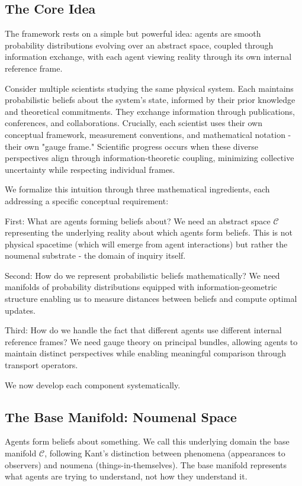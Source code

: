 \documentclass[11pt]{article}
\begin{document}
\subsection{The Core Idea}

The framework rests on a simple but powerful idea: agents are smooth probability distributions evolving over an abstract space, coupled through information exchange, with each agent viewing reality through its own internal reference frame.

Consider multiple scientists studying the same physical system. Each maintains probabilistic beliefs about the system's state, informed by their prior knowledge and theoretical commitments. They exchange information through publications, conferences, and collaborations. Crucially, each scientist uses their own conceptual framework, measurement conventions, and mathematical notation - their own "gauge frame." Scientific progress occurs when these diverse perspectives align through information-theoretic coupling, minimizing collective uncertainty while respecting individual frames.

We formalize this intuition through three mathematical ingredients, each addressing a specific conceptual requirement:

First: What are agents forming beliefs about? We need an abstract space $\mathcal{C}$ representing the underlying reality about which agents form beliefs. This is not physical spacetime (which will emerge from agent interactions) but rather the noumenal substrate - the domain of inquiry itself.

Second: How do we represent probabilistic beliefs mathematically? We need manifolds of probability distributions equipped with information-geometric structure enabling us to measure distances between beliefs and compute optimal updates.

Third: How do we handle the fact that different agents use different internal reference frames? We need gauge theory on principal bundles, allowing agents to maintain distinct perspectives while enabling meaningful comparison through transport operators.

We now develop each component systematically.

\subsection{The Base Manifold: Noumenal Space}

Agents form beliefs about something. We call this underlying domain the base manifold $\mathcal{C}$, following Kant's distinction between phenomena (appearances to observers) and noumena (things-in-themselves). The base manifold represents what agents are trying to understand, not how they understand it.
\end{document}
